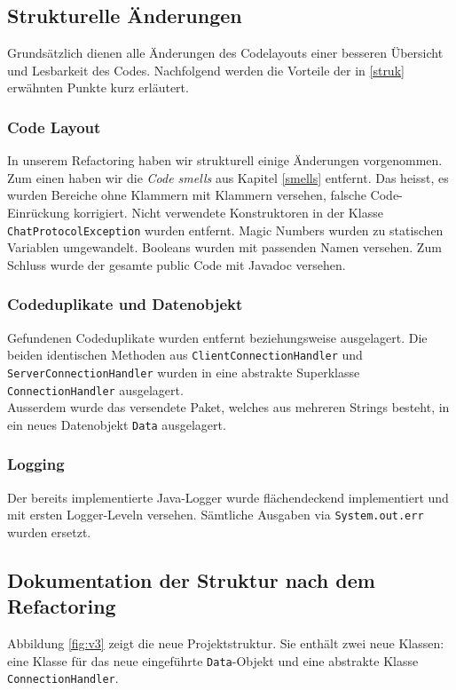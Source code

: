 \documentclass[10pt, hyperref, a4paper]{article}
\begin{document}
\subsection{Strukturelle Änderungen}
Grundsätzlich dienen alle Änderungen des Codelayouts einer besseren Übersicht und Lesbarkeit des Codes. Nachfolgend werden die Vorteile der in \ref{struk} erwähnten Punkte kurz erläutert.

\subsubsection{Code Layout}
In unserem Refactoring haben wir strukturell einige Änderungen vorgenommen. Zum einen haben wir die \emph{Code smells} aus Kapitel \ref{smells} entfernt. Das heisst, es wurden Bereiche ohne Klammern mit Klammern versehen, falsche Code-Einrückung korrigiert. Nicht verwendete Konstruktoren in der Klasse \texttt{ChatProtocolException} wurden entfernt. Magic Numbers wurden zu statischen Variablen umgewandelt. Booleans wurden mit passenden Namen versehen. Zum Schluss wurde der gesamte public Code mit Javadoc versehen. 
\subsubsection{Codeduplikate und Datenobjekt}
Gefundenen Codeduplikate wurden entfernt beziehungsweise ausgelagert. Die beiden identischen Methoden aus \texttt{ClientConnectionHandler} und \texttt{ServerConnectionHandler} wurden in eine abstrakte Superklasse \texttt{ConnectionHandler} ausgelagert.\\
Ausserdem wurde das versendete Paket, welches aus mehreren Strings besteht, in ein neues Datenobjekt \texttt{Data} ausgelagert.

\subsubsection{Logging}
Der bereits implementierte Java-Logger wurde flächendeckend implementiert und mit ersten Logger-Leveln versehen. Sämtliche Ausgaben via \texttt{System.out.err} wurden ersetzt.






\subsection{Dokumentation der Struktur nach dem Refactoring}
Abbildung \ref{fig:v3} zeigt die neue Projektstruktur. Sie enthält zwei neue Klassen: eine Klasse für das neue eingeführte \texttt{Data}-Objekt und eine abstrakte Klasse \texttt{ConnectionHandler}.
\end{document}

